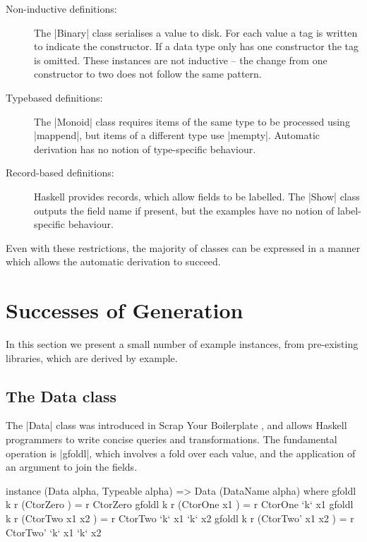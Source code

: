 \documentclass{llncs}
\begin{document}
\begin{description}

\item[Non-inductive definitions:] The |Binary| class serialises a value to disk. For each value a tag is written to indicate the constructor. If a data type only has one constructor the tag is omitted. These instances are not inductive -- the change from one constructor to two does not follow the same pattern.

\item[Typebased definitions:] The |Monoid| class requires items of the same type to be processed using |mappend|, but items of a different type use |mempty|. Automatic derivation has no notion of type-specific behaviour.

\item [Record-based definitions:] Haskell provides records, which allow fields to be labelled. The |Show| class outputs the field name if present, but the examples have no notion of label-specific behaviour.

\end{description}

Even with these restrictions, the majority of classes can be expressed in a manner which allows the automatic derivation to succeed.

\section{Successes of Generation}
\label{sec:automatic_success}

In this section we present a small number of example instances, from pre-existing libraries, which are derived by example.

\subsection{The Data class}

The |Data| class was introduced in Scrap Your Boilerplate \cite{lammel:syb}, and allows Haskell programmers to write concise queries and transformations. The fundamental operation is |gfoldl|, which involves a fold over each value, and the application of an argument to join the fields.

\begin{code}
instance (Data alpha, Typeable alpha) => Data (DataName alpha) where
    gfoldl k r (CtorZero         ) = r CtorZero
    gfoldl k r (CtorOne   x1     ) = r CtorOne   `k` x1
    gfoldl k r (CtorTwo   x1 x2  ) = r CtorTwo   `k` x1 `k` x2
    gfoldl k r (CtorTwo'  x1 x2  ) = r CtorTwo'  `k` x1 `k` x2
\end{code}
\end{document}

